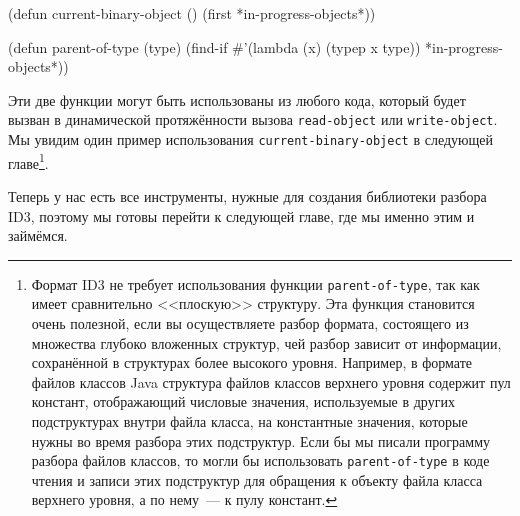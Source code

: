 \begin{myverb}
(defun current-binary-object () (first *in-progress-objects*))

(defun parent-of-type (type)
  (find-if #'(lambda (x) (typep x type)) *in-progress-objects*))
\end{myverb}

Эти две функции могут быть использованы из любого кода, который будет вызван в
динамической протяжённости вызова \lstinline{read-object} или \lstinline{write-object}. Мы увидим
один пример использования \lstinline{current-binary-object} в следующей главе\footnote{Формат
  ID3 не требует использования функции \lstinline{parent-of-type}, так как имеет сравнительно
  <<плоскую>> структуру. Эта функция становится очень полезной, если вы осуществляете
  разбор формата, состоящего из множества глубоко вложенных структур, чей разбор зависит от
  информации, сохранённой в структурах более высокого уровня. Например, в формате файлов
  классов Java структура файлов классов верхнего уровня содержит пул констант,
  отображающий числовые значения, используемые в других подструктурах внутри файла класса,
  на константные значения, которые нужны во время разбора этих подструктур. Если бы мы писали
  программу разбора файлов классов, то могли бы использовать \lstinline{parent-of-type} в коде
  чтения и записи этих подструктур для обращения к объекту файла класса верхнего уровня, а
  по нему~--- к пулу констант.}\hspace{\footnotenegspace}.

Теперь у нас есть все инструменты, нужные для создания библиотеки разбора ID3, поэтому мы
готовы перейти к следующей главе, где мы именно этим и займёмся.

